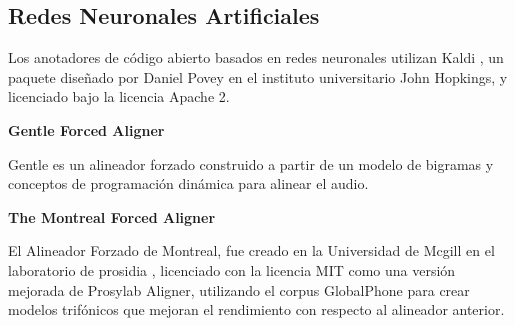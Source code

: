 \subsection{Redes Neuronales Artificiales}

Los anotadores de código abierto basados en redes neuronales utilizan Kaldi \cite{Povey_ASRU2011}, un paquete diseñado por Daniel Povey en el instituto universitario John Hopkings, y licenciado bajo la licencia Apache 2.

\textbf{Gentle Forced Aligner}

Gentle \cite{gentle} es un alineador forzado construido a partir de un modelo de bigramas y conceptos de programación dinámica para alinear el audio.

\textbf{The Montreal Forced Aligner}

El Alineador Forzado de Montreal, fue creado en la Universidad de Mcgill en el laboratorio de prosidia \cite{McAuliffe2017MontrealKaldi}, licenciado con la licencia MIT  como una versión mejorada de Prosylab Aligner, utilizando el corpus GlobalPhone  para crear modelos trifónicos que mejoran el rendimiento con respecto al alineador anterior.
